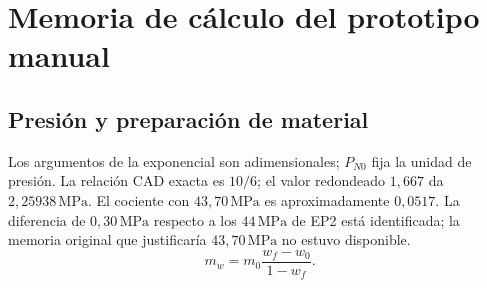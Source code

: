 \section{Memoria de cálculo del prototipo manual}
\subsection{Presión y preparación de material}
Los argumentos de la exponencial son adimensionales; $P_{N0}$ fija la unidad de presión.
La relación CAD exacta es $10/6$; el valor redondeado $1,667$ da $2,25938\,\mathrm{MPa}$.
El cociente con $43,70\,\mathrm{MPa}$ es aproximadamente $0,0517$.
La diferencia de $0,30\,\mathrm{MPa}$ respecto a los $44\,\mathrm{MPa}$ de EP2 está identificada;
la memoria original que justificaría $43,70\,\mathrm{MPa}$ no estuvo disponible.
\begin{equation}m_w=m_0\frac{w_f-w_0}{1-w_f}.\end{equation}
